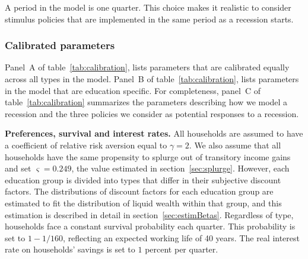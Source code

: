 \documentclass[\econtexRoot/HAFiscal]{subfiles}
\begin{document}
A period in the model is one quarter. This choice makes it realistic to consider stimulus policies that are implemented in the same period as a recession starts. 

\subsubsection{Calibrated parameters} 
\notinsubfile{\label{sec:calib}}

Panel~A of table~\ref{tab:calibration}, lists parameters that are calibrated equally across all types in the model. Panel~B of table~\ref{tab:calibration}, lists parameters in the model that are education specific. For completeness, panel~C of table~\ref{tab:calibration} summarizes the parameters describing how we model a recession and the three policies we consider as potential responses to a recession. 

\textbf{Preferences, survival and interest rates.} All households are assumed to have a coefficient of relative risk aversion equal to $\gamma=2$. We also assume that all households have the same propensity to splurge out of transitory income gains and set $\varsigma=0.249$, the value estimated in section~\ref{sec:splurge}. However, each education group is divided into types that differ in their subjective discount factors. The distributions of discount factors for each education group are estimated to fit the distribution of liquid wealth within that group, and this estimation is described in detail in section~\ref{sec:estimBetas}. Regardless of type, households face a constant survival probability each quarter. This probability is set to $1-1/160$, reflecting an expected working life of 40 years. The real interest rate on households' savings is set to $1$ percent per quarter. 
\end{document}
